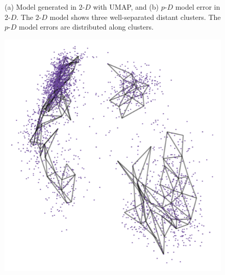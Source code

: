\documentclass[
  12pt]{article}
\begin{document}
\begin{figure}[H]


\caption{\label{fig-model-pbmc-author}(a) Model generated in
\(2\text{-}D\) with UMAP, and (b) \(p\text{-}D\) model error in
\(2\text{-}D\). The \(2\text{-}D\) model shows three well-separated
distant clusters. The \(p\text{-}D\) model errors are distributed along
clusters.}

\end{figure}%

\begin{figure}[H]

\begin{minipage}{0.33\linewidth}
\includegraphics{figures/pbmc3k/sc_1.png}\end{minipage}%
%
\begin{minipage}{0.33\linewidth}

\end{minipage}
\end{figure}
\end{document}
